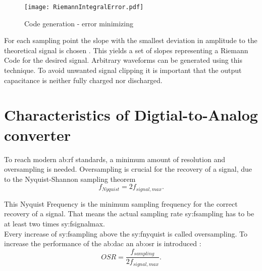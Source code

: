  \begin{figure}[ht]
	\centering
  \texttt{[image: RiemannIntegralError.pdf]}
	\caption{Code generation - error minimizing}
	\label{fig:RiemannIntegralError}
\end{figure}
For each sampling point the slope with the smallest deviation in amplitude to the theoretical signal is chosen \cite{VeyracRivetDevalEtAl2014}.
This yields a set of slopes representing a Riemann Code for the desired signal.
Arbitrary waveforms can be generated using this technique.
To avoid unwanted signal clipping it is important that the output capacitance is neither fully charged nor discharged.

\section{Characteristics of Digtial-to-Analog converter}
\label{ch:characteristics}
To reach modern \gls{ab:rf} standards, a minimum amount of resolution and oversampling is needed.
Oversampling is crucial for the recovery of a signal, due to the Nyquist-Shannon sampling theorem
\begin{equation}
f_{Nyquist} = 2 f_{signal,max}.
\end{equation}
\label{eq:SamplingTheorem}

This Nyquist Frequency is the minimum sampling frequency for the correct recovery of a signal.
That means the actual sampling rate \gls{sy:fsampling} has to be at least two times \gls{sy:fsignalmax}.\\
Every increase of \gls{sy:fsampling} above the \gls{sy:fnyquist} is called oversampling.
To increase the performance of the \gls{ab:dac} an \gls{ab:osr} is introduced \cite{DevalRivetVeyrac2015}:
\begin{equation}
OSR = \frac{f_{sampling}}{2 f_{signal,max}}.
\end{equation}

